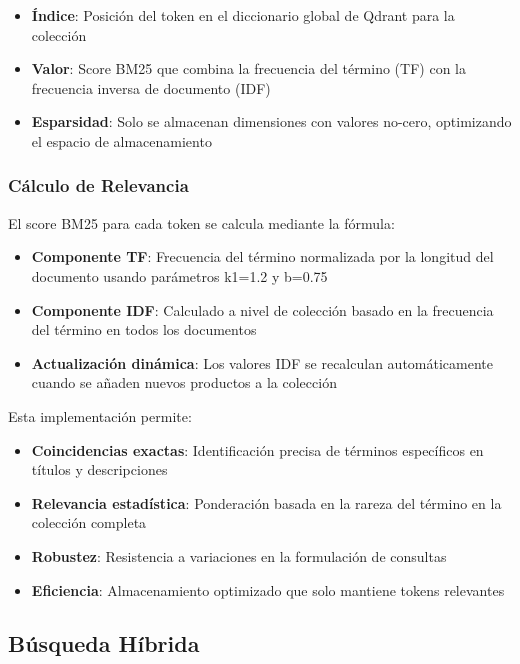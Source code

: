 \begin{itemize}
    \item \textbf{Índice}: Posición del token en el diccionario global de Qdrant para la colección
    \item \textbf{Valor}: Score BM25 que combina la frecuencia del término (TF) con la frecuencia inversa de documento (IDF)
    \item \textbf{Esparsidad}: Solo se almacenan dimensiones con valores no-cero, optimizando el espacio de almacenamiento
\end{itemize}

\subsubsection{Cálculo de Relevancia}

El score BM25 para cada token se calcula mediante la fórmula:

\begin{itemize}
    \item \textbf{Componente TF}: Frecuencia del término normalizada por la longitud del documento usando parámetros k1=1.2 y b=0.75
    \item \textbf{Componente IDF}: Calculado a nivel de colección basado en la frecuencia del término en todos los documentos
    \item \textbf{Actualización dinámica}: Los valores IDF se recalculan automáticamente cuando se añaden nuevos productos a la colección
\end{itemize}

Esta implementación permite:

\begin{itemize}
    \item \textbf{Coincidencias exactas}: Identificación precisa de términos específicos en títulos y descripciones
    \item \textbf{Relevancia estadística}: Ponderación basada en la rareza del término en la colección completa
    \item \textbf{Robustez}: Resistencia a variaciones en la formulación de consultas
    \item \textbf{Eficiencia}: Almacenamiento optimizado que solo mantiene tokens relevantes
\end{itemize}

\subsection{Búsqueda Híbrida}

